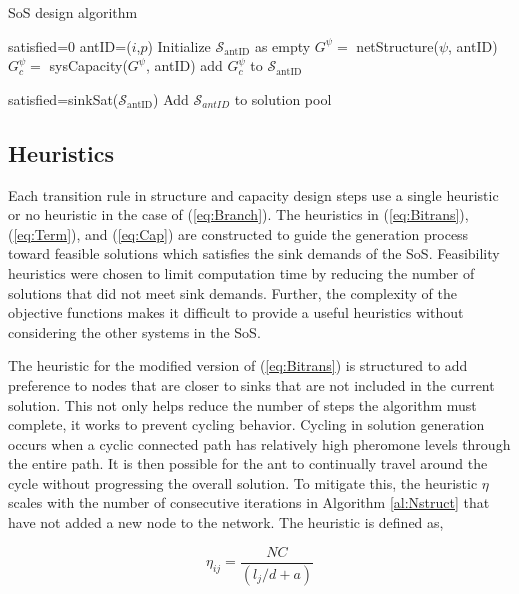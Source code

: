 \documentclass[preprint,12pt,authoryear]{elsarticle}
\begin{document}
\begin{algorithm}
	\caption{SoS design algorithm}
	\label{al:SoS}
	\begin{algorithmic}[1]
		\State satisfied=0
		\State antID=($i$,$p$)
		\State Initialize $\mathcal{S}_{\text{antID}}$ as empty
		\State $G^\psi=$ netStructure($\psi$, antID)
		\State $G^\psi_c=$ sysCapacity($G^\psi$, antID)
		\State add $G^\psi_c$ to $\mathcal{S}_{\text{antID}}$
		\EndFor
		
		\State satisfied=sinkSat($\mathcal{S}_{\text{antID}}$)
		\EndWhile
		\State Add $\mathcal{S}_{antID}$ to solution pool
		\EndFor
		\EndProcedure
	\end{algorithmic}
\end{algorithm}


\subsection{Heuristics} \label{s:heur}

Each transition rule in structure and capacity design steps use a single heuristic or no heuristic in the case of (\ref{eq:Branch}). The heuristics in (\ref{eq:Bitrans}), (\ref{eq:Term}), and (\ref{eq:Cap}) are constructed to guide the generation process toward feasible solutions which satisfies the sink demands of the SoS. Feasibility heuristics were chosen to limit computation time by reducing the number of solutions that did not meet sink demands. Further, the complexity of the objective functions makes it difficult to provide a useful heuristics without considering the other systems in the SoS.

The heuristic for the modified version of (\ref{eq:Bitrans}) is structured to add preference to nodes that are closer to sinks that are not included in the current solution. This not only helps reduce the number of steps the algorithm must complete, it works to prevent cycling behavior. Cycling in solution generation occurs when a cyclic connected path has relatively high pheromone levels through the entire path. It is then possible for the ant to continually travel around the cycle without progressing the overall solution. To mitigate this, the heuristic $\eta$ scales with the number of consecutive iterations in Algorithm \ref{al:Nstruct} that have not added a new node to the network. The heuristic is defined as,

\begin{equation}
	\eta_{ij}=\frac{NC}{(l_j/d+a)}
	\label{eq:eta}
\end{equation}
\end{document}
